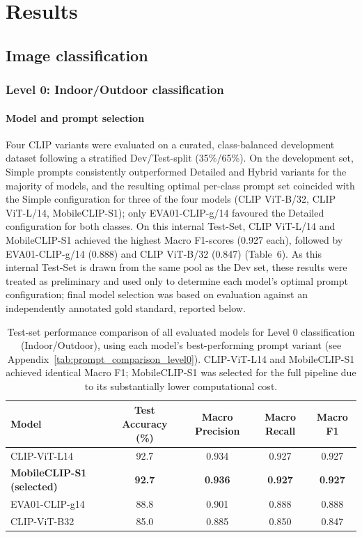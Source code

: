 \documentclass[hidelinks, 11pt]{article}
\begin{document}
\section{Results}
\subsection{Image classification}
\subsubsection{Level 0: Indoor/Outdoor classification}
\paragraph{Model and prompt selection}
Four CLIP variants were evaluated on a curated, class-balanced development dataset following a stratified Dev/Test-split (35\%/65\%). On the development set, Simple prompts consistently outperformed Detailed and Hybrid variants for the majority of models, and the resulting optimal per-class prompt set coincided with the Simple configuration for three of the four models (CLIP ViT-B/32, CLIP ViT-L/14, MobileCLIP-S1); only EVA01-CLIP-g/14 favoured the Detailed configuration for both classes. On this internal Test-Set, CLIP ViT-L/14 and MobileCLIP-S1 achieved the highest Macro F1-scores (0.927 each), followed by EVA01-CLIP-g/14 (0.888) and CLIP ViT-B/32 (0.847) (Table~6). As this internal Test-Set is drawn from the same pool as the Dev set, these results were treated as preliminary and used only to determine each model's optimal prompt configuration; final model selection was based on evaluation against an independently annotated gold standard, reported
below.
\begin{table}[htbp]
\centering
\caption{Test-set performance comparison of all evaluated models for Level 0 classification (Indoor/Outdoor), using each model's best-performing prompt variant (see Appendix~\ref{tab:prompt_comparison_level0}). CLIP-ViT-L14 and MobileCLIP-S1 achieved identical Macro F1; MobileCLIP-S1 was selected for the full pipeline due to its substantially lower computational cost.}
\label{tab:level0_final_comparison}
\begin{tabular}{@{}lcccc@{}}
\toprule
\textbf{Model} & \textbf{Test Accuracy (\%)} & \textbf{Macro Precision} & \textbf{Macro Recall} & \textbf{Macro F1} \\
\midrule
CLIP-ViT-L14              & 92.7 & 0.934 & 0.927 & 0.927 \\
\textbf{MobileCLIP-S1 (selected)} & \textbf{92.7} & \textbf{0.936} & \textbf{0.927} & \textbf{0.927} \\
EVA01-CLIP-g14             & 88.8 & 0.901 & 0.888 & 0.888 \\
CLIP-ViT-B32               & 85.0 & 0.885 & 0.850 & 0.847 \\
\bottomrule
\end{tabular}
\end{table}
\end{document}
